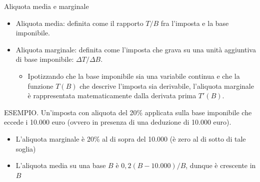\documentclass[aspectratio=64,12pt]{beamer}
\begin{document}
\begin{frame}{Aliquota media e marginale}
\begin{itemize}
\item \alert{Aliquota media:} definita come il rapporto $T/B$ fra l'imposta e la base imponibile.
\item \alert{Aliquota marginale:} definita come l'imposta che grava su una unità aggiuntiva di base imponibile: $\Delta T/\Delta B$.
\begin{itemize}
\item Ipotizzando che la base imponibile sia una variabile continua e che la
funzione $T(B)$ che descrive l'imposta sia derivabile, l'aliquota
marginale è rappresentata matematicamente dalla derivata prima $T'(B)$.
\end{itemize}
\end{itemize}
\bigskip

\begin{resize}{.9}
\begin{block}{}
\alert{ESEMPIO}. Un'imposta con aliquota del 20\% applicata sulla base imponibile che eccede i 10.000 euro (ovvero in presenza di una deduzione di 10.000 euro).
\begin{itemize}
\item L'aliquota marginale è 20\% al di sopra del 10.000 (è zero al di sotto di tale soglia)
\item L'aliquota media su una base $B$ è $0,2(B-10.000)/B$, dunque è crescente in $B$
\end{itemize}
\end{block}
\end{resize}
\end{frame}
\end{document}
